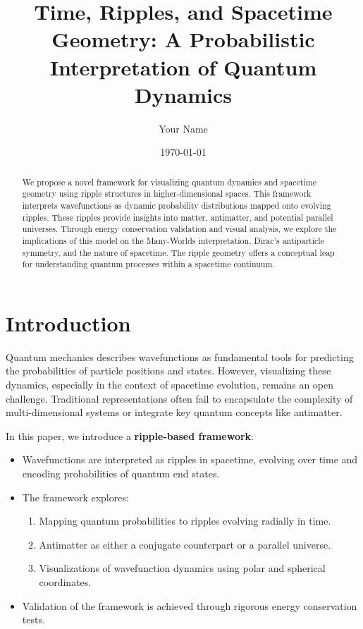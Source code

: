 \documentclass[12pt]{article}
\title{Time, Ripples, and Spacetime Geometry: A Probabilistic Interpretation of Quantum Dynamics}
\author{Your Name}
\date{\today}
\begin{document}
\maketitle

\begin{abstract}
We propose a novel framework for visualizing quantum dynamics and spacetime geometry using ripple structures in higher-dimensional spaces. 
This framework interprets wavefunctions as dynamic probability distributions mapped onto evolving ripples. These ripples provide insights 
into matter, antimatter, and potential parallel universes. Through energy conservation validation and visual analysis, we explore the 
implications of this model on the Many-Worlds interpretation, Dirac’s antiparticle symmetry, and the nature of spacetime. The ripple 
geometry offers a conceptual leap for understanding quantum processes within a spacetime continuum.
\end{abstract}

\tableofcontents

\section{Introduction}
Quantum mechanics describes wavefunctions as fundamental tools for predicting the probabilities of particle positions and states. However, visualizing these dynamics, especially in the context of spacetime evolution, remains an open challenge. Traditional representations often fail to encapsulate the complexity of multi-dimensional systems or integrate key quantum concepts like antimatter.

In this paper, we introduce a \textbf{ripple-based framework}:
\begin{itemize}
    \item Wavefunctions are interpreted as ripples in spacetime, evolving over time and encoding probabilities of quantum end states.
    \item The framework explores:
    \begin{enumerate}
        \item Mapping quantum probabilities to ripples evolving radially in time.
        \item Antimatter as either a conjugate counterpart or a parallel universe.
        \item Visualizations of wavefunction dynamics using polar and spherical coordinates.
    \end{enumerate}
    \item Validation of the framework is achieved through rigorous energy conservation tests.
\end{itemize}
\end{document}
